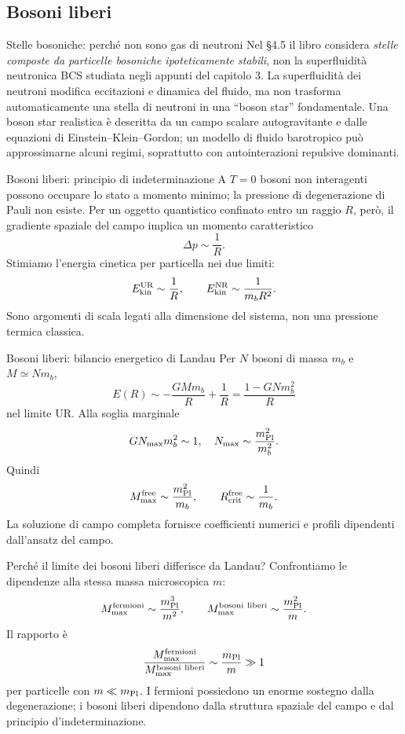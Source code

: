 \subsection{Bosoni liberi}

\begin{frame}[t]{Stelle bosoniche: perché non sono gas di neutroni}
\small
Nel §4.5 il libro considera \emph{stelle composte da particelle bosoniche ipoteticamente stabili}, non la superfluidità neutronica BCS studiata negli appunti del capitolo 3.
\medskip
La superfluidità dei neutroni modifica eccitazioni e dinamica del fluido, ma non trasforma automaticamente una stella di neutroni in una ``boson star'' fondamentale.
\medskip
Una boson star realistica è descritta da un campo scalare autogravitante e dalle equazioni di Einstein--Klein--Gordon; un modello di fluido barotropico può approssimarne alcuni regimi, soprattutto con autointerazioni repulsive dominanti.
\end{frame}

\begin{frame}[t]{Bosoni liberi: principio di indeterminazione}
\small
A $T=0$ bosoni non interagenti possono occupare lo stato a momento minimo; la pressione di degenerazione di Pauli non esiste.
\medskip
Per un oggetto quantistico confinato entro un raggio $R$, però, il gradiente spaziale del campo implica un momento caratteristico
\[
\Delta p\sim\frac1R.
\]
Stimiamo l'energia cinetica per particella nei due limiti:
\[
E_{\rm kin}^{\rm UR}\sim\frac1R,
\qquad E_{\rm kin}^{\rm NR}\sim\frac1{m_bR^2}.
\]
Sono argomenti di scala legati alla dimensione del sistema, non una pressione termica classica.
\end{frame}

\begin{frame}[t]{Bosoni liberi: bilancio energetico di Landau}
\small
Per $N$ bosoni di massa $m_b$ e $M\simeq Nm_b$,
\[
E(R)\sim-\frac{GMm_b}R+\frac1R
=\frac{1-GNm_b^2}{R}
\]
nel limite UR. Alla soglia marginale
\[
GN_{\max}m_b^2\sim1,
\quad N_{\max}\sim\frac{m_{\rm Pl}^2}{m_b^2}.
\]
Quindi
\[
M_{\max}^{\rm free}\sim\frac{m_{\rm Pl}^2}{m_b},
\qquad R_{\rm crit}^{\rm free}\sim\frac1{m_b}.
\]
La soluzione di campo completa fornisce coefficienti numerici e profili dipendenti dall'ansatz del campo.
\end{frame}

\begin{frame}[t]{Perché il limite dei bosoni liberi differisce da Landau?}
\small
Confrontiamo le dipendenze alla stessa massa microscopica $m$:
\[
M_{\max}^{\rm fermioni}\sim\frac{m_{\rm Pl}^3}{m^2},
\qquad M_{\max}^{\rm bosoni\ liberi}\sim\frac{m_{\rm Pl}^2}{m}.
\]
Il rapporto è
\[
\frac{M_{\max}^{\rm fermioni}}{M_{\max}^{\rm bosoni\ liberi}}
\sim\frac{m_{\rm Pl}}m\gg1
\]
per particelle con $m\ll m_{\rm Pl}$. I fermioni possiedono un enorme sostegno dalla degenerazione; i bosoni liberi dipendono dalla struttura spaziale del campo e dal principio d'indeterminazione.
\end{frame}

